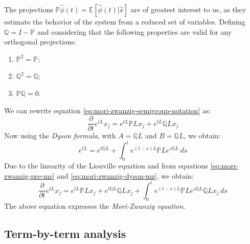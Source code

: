\documentclass[12pt]{article}
\begin{document}
The projections $\mathbb{P}\hat{\phi}(t) = \mathbb{E}[\hat{\phi}(t) | \hat{x}]$ are of greatest interest to us, as they estimate the behavior of the system from a reduced set of variables.
Defining $\mathbb{Q} = I - \mathbb{P}$ and considering that the following properties are valid for any orthogonal projections:
\begin{enumerate}
    \item $\mathbb{P}^2 = \mathbb{P}$;
    
\item $\mathbb{Q}^2 = \mathbb{Q}$;
    \item $\mathbb{P}\mathbb{Q} = 0$.
\end{enumerate}
We can rewrite equation \eqref{eq:mori-zwanzig-semigroup-notation} as:
\begin{equation}
\frac{\partial }{\partial t}e^{tL}x_j = e^{tL}\mathbb{P}Lx_j + e^{tL}\mathbb{Q}Lx_j
\label{eq:mori-zwanzig-pre-mz}
\end{equation}
Now using the \textit{Dyson formula}, with $A = \mathbb{Q}L$ and $B = \mathbb{Q}L$, we obtain:
\begin{equation}
    e^{tL} = e^{t\mathbb{Q}L} + \int_0^t e^{(t-s)L} \mathbb{P}L e^{s\mathbb{Q}L} \, ds
    
\label{eq:mori-zwanzig-dyson-mz}
\end{equation}
Due to the linearity of the Liouville equation and from equations \eqref{eq:mori-zwanzig-pre-mz} and \eqref{eq:mori-zwanzig-dyson-mz}, we obtain:
\begin{equation}
    \frac{\partial}{\partial t} e^{tL} x_j = e^{tL} \mathbb{P}L x_j + e^{t\mathbb{Q}L} \mathbb{Q}L x_j + \int_0^t e^{(t-s)L} \mathbb{P}L e^{s\mathbb{Q}L} \mathbb{Q}L x_j \, ds
    
\label{eq:mori-zwanzig}
\end{equation}
The above equation expresses the \textit{Mori-Zwanzig equation}.
\subsection{Term-by-term analysis}
\end{document}
